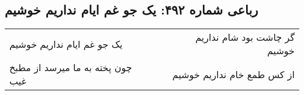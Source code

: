 \begin{center}
\section*{رباعی شماره ۴۹۲: یک جو غم ایام نداریم خوشیم}
\label{sec:sh492}
\begin{longtable}{l p{0.5cm} r}
یک جو غم ایام نداریم خوشیم
&&
گر چاشت بود شام نداریم خوشیم
\\
چون پخته به ما میرسد از مطبخ غیب
&&
از کس طمع خام نداریم خوشیم
\\
\end{longtable}
\end{center}
